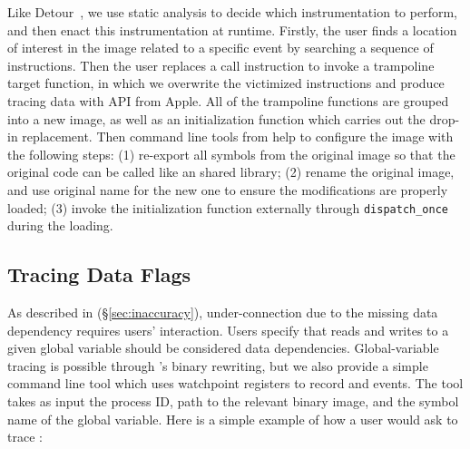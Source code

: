 Like Detour~\cite{hunt1999detours}, we use static analysis to decide which
instrumentation to perform, and then enact this instrumentation at runtime.
Firstly, the user finds a location of interest in the image related to a
specific event by searching a sequence of instructions. Then the user replaces a
call instruction to invoke a trampoline target function, in which we overwrite
the victimized instructions and produce tracing data with API from Apple.
All of the trampoline functions are grouped into a new image, as well as an
initialization function which carries out the drop-in replacement. Then command
line tools from \xxx help to configure the image with the following steps: (1)
re-export all symbols from the original image so that the original code can be
called like an shared library; (2) rename the original image, and use original
name for the new one to ensure the modifications are properly loaded; (3) invoke
the initialization function externally through \texttt{dispatch\_once} during
the loading.



\subsection{Tracing Data Flags} \label{subsec:tcp}

As described in (\S\ref{sec:inaccuracy}), under-connection due to the missing
data dependency requires users' interaction. Users specify that reads and
writes to a given global variable should be considered data dependencies.
Global-variable tracing is possible through \xxx's binary rewriting, but we
also provide a simple command line tool which uses watchpoint registers to
record \dataflagwrite and \dataflagread events. The tool takes as input the
process ID, path to the relevant binary image, and the symbol name of the
global variable. Here is a simple example of how a user would ask \xxx to trace
:

